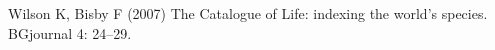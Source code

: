 \documentclass[
]{article}
\newlength{\cslhangindent}
\newlength{\cslentryspacingunit} %
\newenvironment{CSLReferences}[2] %
 {%
  \setlength{\parindent}{0pt}
  \ifodd #1
  \let\oldpar\par
  \def\par{\hangindent=\cslhangindent\oldpar}
  \fi
  \setlength{\parskip}{#2\cslentryspacingunit}
 }%
 {}
\begin{document}
\begin{CSLReferences}{1}{0}
\leavevmode{}%
Wilson K, Bisby F (2007) {The Catalogue of Life: indexing the world's
species}. BGjournal 4: 24--29.

\end{CSLReferences}
\end{document}
